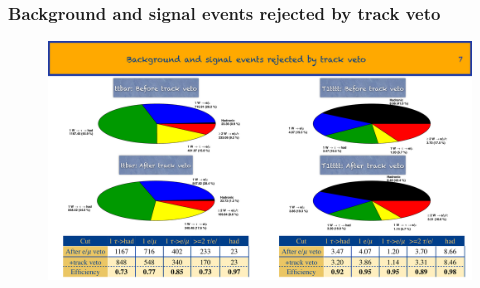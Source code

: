 \documentclass{beamer}
\begin{document}
\begin{frame}
  \frametitle{Background and signal events rejected by track veto}
  \begin{figure}
    \includegraphics[width=\textwidth]{figures/jacks_Studies/rejection_slide}
  \end{figure}
\end{frame}
\end{document}
